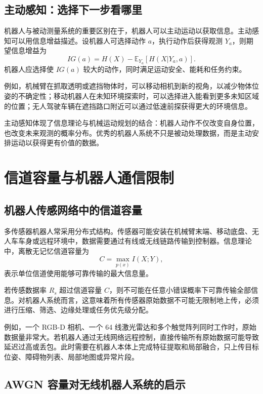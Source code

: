 \documentclass[UTF8,a4paper,12pt]{ctexart}
\begin{document}
\subsection{主动感知：选择下一步看哪里}

机器人与被动测量系统的重要区别在于，机器人可以主动运动以获取信息。主动感知可以用信息增益描述。设机器人可选择动作 $a$，执行动作后获得观测 $Y_a$，则期望信息增益为
\begin{equation}
IG(a)=H(X)-\mathbb{E}_{Y_a}\left[H(X|Y_a,a)\right].
\end{equation}
机器人应选择使 $IG(a)$ 较大的动作，同时满足运动安全、能耗和任务约束。

例如，机械臂在抓取透明或遮挡物体时，可以移动相机到新的视角，以减少物体位姿的不确定性；移动机器人在未知环境探索时，可以选择进入能看到更多未知区域的位置；无人驾驶车辆在遮挡路口附近可以通过低速前探获得更大的环境信息。

主动感知体现了信息理论与机械运动规划的结合：机器人动作不仅改变自身位置，也改变未来观测的概率分布。优秀的机器人系统不只是被动处理数据，而是主动安排运动以获得更有价值的数据。

\section{信道容量与机器人通信限制}

\subsection{机器人传感网络中的信道容量}

多传感器机器人常采用分布式结构。传感器可能安装在机械臂末端、移动底盘、无人车车身或远程环境中，数据需要通过有线或无线链路传输到控制器。信息理论中，离散无记忆信道容量为
\begin{equation}
C=\max_{p(x)} I(X;Y),
\end{equation}
表示单位信道使用能够可靠传输的最大信息量。

若传感数据率 $R_s$ 超过信道容量 $C$，则不可能在任意小错误概率下可靠传输全部信息。对机器人系统而言，这意味着所有传感器原始数据不可能无限制地上传，必须进行压缩、筛选、边缘处理或任务优先级分配。

例如，一个 RGB-D 相机、一个 64 线激光雷达和多个触觉阵列同时工作时，原始数据量非常大。若机器人通过无线网络远程控制，直接传输所有原始数据可能导致延迟过高或丢包。此时需要在机器人本体上完成特征提取和局部融合，只上传目标位姿、障碍物列表、局部地图或异常片段。

\subsection{AWGN 容量对无线机器人系统的启示}
\end{document}
